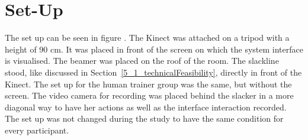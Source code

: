 \section{Set-Up}
The set up can be seen in figure . The Kinect was attached on a tripod with a height of 90 cm. It was placed in front of the screen on which the system interface is visualised. The beamer was placed on the roof of the room. The slackline stood, like discussed in Section~\ref{5_1_technicalFeasibility}, directly in front of the Kinect.
The set up for the human trainer group was the same, but without the screen. The video camera for recording was placed behind the slacker in a more diagonal way to have her actions as well as the interface interaction recorded. The set up was not changed during the study to have the same condition for every participant.



